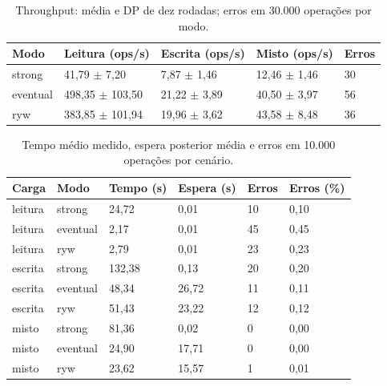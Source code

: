 \begingroup\small\setlength{\tabcolsep}{4pt}
\begin{table}[htbp]\centering
\caption{Throughput: média e DP de dez rodadas; erros em 30.000 operações por modo.}
\begin{tabular}{lllll}
\toprule
Modo & Leitura (ops/s) & Escrita (ops/s) & Misto (ops/s) & Erros\\\midrule
strong & 41,79 $\pm$ 7,20 & 7,87 $\pm$ 1,46 & 12,46 $\pm$ 1,46 & 30\\
eventual & 498,35 $\pm$ 103,50 & 21,22 $\pm$ 3,89 & 40,50 $\pm$ 3,97 & 56\\
ryw & 383,85 $\pm$ 101,94 & 19,96 $\pm$ 3,62 & 43,58 $\pm$ 8,48 & 36\\
\bottomrule\end{tabular}\end{table}
\endgroup

\begingroup\small\setlength{\tabcolsep}{4pt}
\begin{table}[htbp]\centering
\caption{Tempo médio medido, espera posterior média e erros em 10.000 operações por cenário.}
\begin{tabular}{llllll}
\toprule
Carga & Modo & Tempo (s) & Espera (s) & Erros & Erros (\%)\\\midrule
leitura & strong & 24,72 & 0,01 & 10 & 0,10\\
leitura & eventual & 2,17 & 0,01 & 45 & 0,45\\
leitura & ryw & 2,79 & 0,01 & 23 & 0,23\\
escrita & strong & 132,38 & 0,13 & 20 & 0,20\\
escrita & eventual & 48,34 & 26,72 & 11 & 0,11\\
escrita & ryw & 51,43 & 23,22 & 12 & 0,12\\
misto & strong & 81,36 & 0,02 & 0 & 0,00\\
misto & eventual & 24,90 & 17,71 & 0 & 0,00\\
misto & ryw & 23,62 & 15,57 & 1 & 0,01\\
\bottomrule\end{tabular}\end{table}
\endgroup

